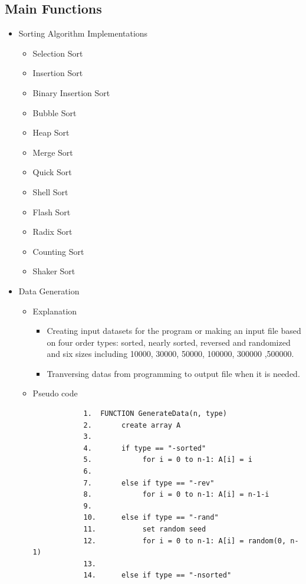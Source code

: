 \subsection{Main Functions}
\begin{itemize}
    \item Sorting Algorithm Implementations
    \begin{itemize}
        \item Selection Sort
        \item Insertion Sort
        \item Binary Insertion Sort
        \item Bubble Sort
        \item Heap Sort
        \item Merge Sort
        \item Quick Sort
        \item Shell Sort
        \item Flash Sort
        \item Radix Sort
        \item Counting Sort
        \item Shaker Sort
    \end{itemize}
    \item Data Generation
    \begin{itemize}
        \item Explanation
        \begin{itemize}
            \item Creating input datasets for the program or making an input file based on four order types: sorted, nearly sorted, reversed and randomized and six sizes including 10000, 30000, 50000, 100000, 300000 ,500000.
            \item Tranversing datas from programming to output file when it is needed.
        \end{itemize}
        \item Pseudo code
        \begin{verbatim}
            1.  FUNCTION GenerateData(n, type)
            2.       create array A
            3.
            4.       if type == "-sorted"
            5.            for i = 0 to n-1: A[i] = i
            6.
            7.       else if type == "-rev"
            8.            for i = 0 to n-1: A[i] = n-1-i
            9.
            10.      else if type == "-rand"
            11.           set random seed
            12.           for i = 0 to n-1: A[i] = random(0, n-1)
            13.
            14.      else if type == "-nsorted"

\end{verbatim}
\end{itemize}
\end{itemize}
